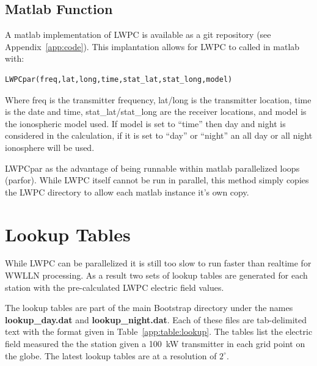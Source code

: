 \subsection{Matlab Function}

A matlab implementation of LWPC is available as a git repository (see Appendix~\ref{app:code}).
This implantation allows for LWPC to called in matlab with:

\begin{verbatim}
LWPCpar(freq,lat,long,time,stat_lat,stat_long,model)
\end{verbatim}

Where freq is the transmitter frequency, lat/long is the transmitter location, time is the date and time, stat\_lat/stat\_long are the receiver locations, and model is the ionospheric model used.
If model is set to ``time'' then day and night is considered in the calculation, if it is set to ``day'' or ``night'' an all day or all night ionosphere will be used.

LWPCpar as the advantage of being runnable within matlab parallelized loops (parfor).
While LWPC itself cannot be run in parallel, this method simply copies the LWPC directory to allow each matlab instance it's own copy.

\section{Lookup Tables}

While LWPC can be parallelized it is still too slow to run faster than realtime for WWLLN processing.
As a result two sets of lookup tables are generated for each station with the pre-calculated LWPC electric field values.

The lookup tables are part of the main Bootstrap directory under the names \textbf{lookup\_day.dat} and \textbf{lookup\_night.dat}.
Each of these files are tab-delimited text with the format given in Table~\ref{app:table:lookup}.
The tables list the electric field measured the the station given a 100~kW transmitter in each grid point on the globe.
The latest lookup tables are at a resolution of $2^\circ$.

